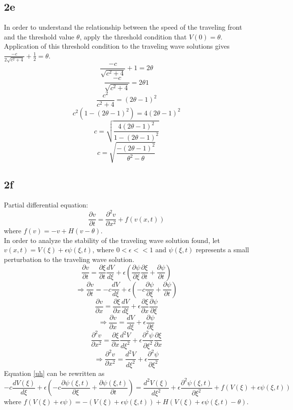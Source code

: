 \documentclass[11pt, oneside]{article}   	%
\begin{document}
\subsection{2e}
In order to understand the relationship between the speed of the traveling front and the threshold value $\theta$, apply the threshold condition that $V(0)=\theta$. Application of this threshold condition to the traveling wave solutions gives $\frac{-c}{2\sqrt{c^2+4}}+\frac{1}{2}=\theta$.
$$\frac{-c}{\sqrt{c^2+4}}+1=2\theta$$
$$\frac{-c}{\sqrt{c^2+4}}=2\theta1$$
$$\frac{c^2}{c^2+4}=(2\theta-1)^2$$
$$c^2(1-(2\theta-1)^2)=4(2\theta-1)^2$$
$$c=\sqrt{\frac{4(2\theta-1)^2}{1-(2\theta-1)^2}}$$
$$c=\sqrt{\frac{-(2\theta-1)^2}{\theta^2-\theta}}$$
\subsection{2f}
Partial differential equation: 
\begin{equation}
\label{uh}
\frac{\partial v}{\partial t}=\frac{\partial ^2 v}{\partial x^2}+f(v(x,t))
\end{equation}
where $f(v)=-v+H(v-\theta)$.\\
In order to analyze the stability of the traveling wave solution found, let $v(x,t)=V(\xi)+\epsilon\psi(\xi,t)$, where $0 < \epsilon <<1$ and $\psi(\xi,t)$ represents a small perturbation to the traveling wave solution. 
$$\frac{\partial v}{\partial t}=\frac{\partial\xi}{\partial t}\frac{dV}{d\xi}+\epsilon(\frac{\partial \psi}{\partial \xi}\frac{\partial \xi}{\partial t}+\frac{\partial \psi}{\partial t})$$
$$\Rightarrow \frac{\partial v}{\partial t}=-c\frac{dV}{d\xi}+\epsilon(-c\frac{\partial \psi}{\partial \xi}+\frac{\partial \psi}{\partial t})$$
$$\frac{\partial v}{\partial x}=\frac{\partial \xi}{\partial x}\frac{dV}{d\xi}+\epsilon\frac{\partial\xi}{\partial x}\frac{\partial\psi}{\partial\xi}$$
$$\Rightarrow \frac{\partial v}{\partial x}=\frac{dV}{d\xi}+\epsilon\frac{\partial\psi}{\partial\xi}$$
$$\frac{\partial^2 v}{\partial x^2}=\frac{\partial \xi}{\partial x}\frac{d^2V}{d\xi^2}+\epsilon\frac{\partial^2\psi}{\partial\xi^2}\frac{\partial \xi}{\partial x}$$
$$\Rightarrow \frac{\partial^2 v}{\partial x^2}=\frac{d^2V}{d\xi^2}+\epsilon\frac{\partial^2\psi}{\partial\xi^2}$$
Equation \ref{uh} can be rewritten as 
\begin{equation}
\label{frewritten}
-c\frac{dV(\xi)}{d\xi}+\epsilon(-c\frac{\partial \psi(\xi,t)}{\partial \xi}+\frac{\partial \psi(\xi,t)}{\partial t})=\frac{d^2V(\xi)}{d\xi^2}+\epsilon\frac{\partial^2\psi(\xi,t)}{\partial\xi^2}+f(V(\xi)+\epsilon\psi(\xi,t))
\end{equation}
where $f(V(\xi)+\epsilon\psi)=-(V(\xi)+\epsilon\psi(\xi,t))+H(V(\xi)+\epsilon\psi(\xi,t)-\theta)$.\\
\end{document}
